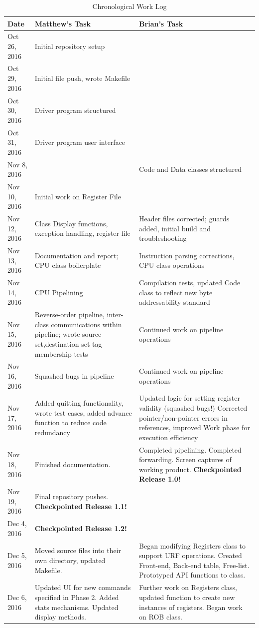 \documentclass[12pt]{article}
\begin{document}
\begin{table}
\centering
\caption{Chronological Work Log}
\label{tab:worklog}
\begin{tabular}{l|p{2.75in}|p{2.75in}}
Date         	& Matthew's Task
							& Brian's Task \\
\hline
Oct 26, 2016 	& Initial repository setup
							& \\
Oct 29, 2016 	& Initial file push, wrote Makefile
							& \\
Oct 30, 2016 	& Driver program structured
							& \\
Oct 31, 2016 	& Driver program user interface
							&  \\
Nov 8, 2016  	&
							& Code and Data classes structured \\
Nov 10, 2016 	& Initial work on Register File
							& \\
Nov 12, 2016 	& Class Display functions, exception handling, register file
							& Header files corrected; guards added, initial build and troubleshooting \\
Nov 13, 2016 	& Documentation and report; CPU class boilerplate
							& Instruction parsing corrections, CPU class operations \\
Nov 14, 2016 	& CPU Pipelining
							& Compilation tests, updated Code class to reflect new byte addressability standard \\
Nov 15, 2016 	& Reverse-order pipeline, inter-class communications within pipeline; wrote source set,destination set tag membership tests
							& Continued work on pipeline operations \\
Nov 16, 2016 	& Squashed bugs in pipeline
							& Continued work on pipeline operations \\
Nov 17, 2016 	& Added quitting functionality, wrote test cases, added advance function to reduce code redundancy
							& Updated logic for setting register validity (squashed bugs!) Corrected pointer/non-pointer errors in references, improved Work phase for execution efficiency \\
Nov 18, 2016 	& Finished documentation.
							& Completed pipelining. Completed forwarding. Screen captures of working product. \textbf{Checkpointed Release 1.0!} \\
Nov 19, 2016 	& Final repository pushes. \textbf{Checkpointed Release 1.1!}
							& \\
Dec 4, 2016  	& \textbf{Checkpointed Release 1.2!}
							&  \\
\hline
Dec 5, 2016  	& Moved source files into their own directory, updated Makefile.
							& Began modifying Registers class to support URF operations. Created Front-end, Back-end table, Free-list. Prototyped API functions to class. \\
Dec 6, 2016  	& Updated UI for new commands specified in Phase 2. Added stats mechanisms. Updated display methods.
							& Further work on Registers class, updated function to create new instances of registers. Began work on ROB class. \\
\end{tabular}
\end{table}
\end{document}
